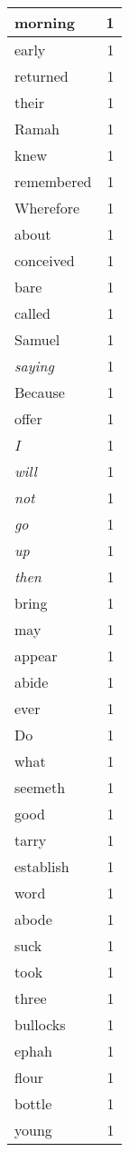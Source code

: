 \begin{center}
\begin{longtable}{l|r}
morning & 1 \\ \hline
early & 1 \\ \hline
returned & 1 \\ \hline
their & 1 \\ \hline
Ramah & 1 \\ \hline
knew & 1 \\ \hline
remembered & 1 \\ \hline
Wherefore & 1 \\ \hline
about & 1 \\ \hline
conceived & 1 \\ \hline
bare & 1 \\ \hline
called & 1 \\ \hline
Samuel & 1 \\ \hline
\emph{saying} & 1 \\ \hline
Because & 1 \\ \hline
offer & 1 \\ \hline
\emph{I} & 1 \\ \hline
\emph{will} & 1 \\ \hline
\emph{not} & 1 \\ \hline
\emph{go} & 1 \\ \hline
\emph{up} & 1 \\ \hline
\emph{then} & 1 \\ \hline
bring & 1 \\ \hline
may & 1 \\ \hline
appear & 1 \\ \hline
abide & 1 \\ \hline
ever & 1 \\ \hline
Do & 1 \\ \hline
what & 1 \\ \hline
seemeth & 1 \\ \hline
good & 1 \\ \hline
tarry & 1 \\ \hline
establish & 1 \\ \hline
word & 1 \\ \hline
abode & 1 \\ \hline
suck & 1 \\ \hline
took & 1 \\ \hline
three & 1 \\ \hline
bullocks & 1 \\ \hline
ephah & 1 \\ \hline
flour & 1 \\ \hline
bottle & 1 \\ \hline
young & 1 \\ \hline

\end{longtable}
\end{center}
